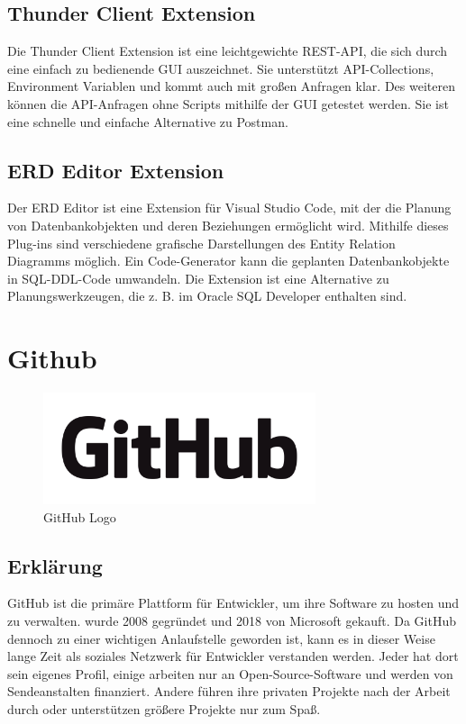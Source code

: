 \subsection{Thunder Client Extension}
\cite{ThunderClientRangav}

Die Thunder Client Extension ist eine leichtgewichte REST-API, die sich durch eine einfach zu bedienende GUI auszeichnet.
Sie unterstützt API-Collections, Environment Variablen und kommt auch mit großen Anfragen klar. Des weiteren können die API-Anfragen 
ohne Scripts mithilfe der GUI getestet werden. Sie ist eine schnelle und einfache Alternative zu Postman.

\subsection{ERD Editor Extension}
\cite{ErdEditor}

Der ERD Editor ist eine Extension für Visual Studio Code, mit der die Planung von Datenbankobjekten und deren 
Beziehungen ermöglicht wird. Mithilfe dieses Plug-ins sind verschiedene grafische Darstellungen des Entity Relation Diagramms möglich.
Ein Code-Generator kann die geplanten Datenbankobjekte in SQL-DDL-Code umwandeln. Die Extension ist eine Alternative zu Planungswerkzeugen, 
die z. B. im Oracle SQL Developer enthalten sind.
\newpage

\section{Github}
\cite{GitHub}
\begin{figure}[h]
    \begin{center}
        \includegraphics*[width=8cm]{pics/GitHub_Logo.png}
        \caption[GitHub Logo]{GitHub Logo \cite{GithubLogo}}
    \end{center}
\end{figure}
\subsection*{Erklärung}
GitHub ist die primäre Plattform für Entwickler, um ihre Software zu hosten 
und zu verwalten. wurde 2008 gegründet und 2018 von Microsoft gekauft. 
Da GitHub dennoch zu einer wichtigen Anlaufstelle geworden ist, 
kann es in dieser Weise lange Zeit als soziales Netzwerk für Entwickler 
verstanden werden. Jeder hat dort sein eigenes Profil, einige arbeiten 
nur an Open-Source-Software und werden von Sendeanstalten finanziert. 
Andere führen ihre privaten Projekte nach der Arbeit durch oder unterstützen 
größere Projekte nur zum Spaß.
